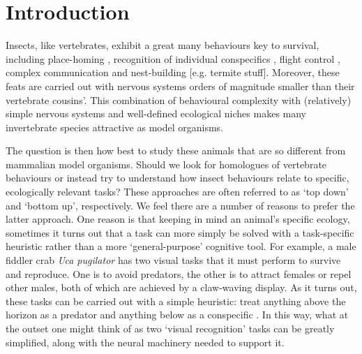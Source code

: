 \section*{Introduction}

Insects, like vertebrates, exhibit a great many behaviours key to survival, including place-homing \cite{Ofstad2011}, recognition of individual conspecifics \cite{Sheehan2008}, flight control \cite{Taylor2001,Gotz1987}, complex communication \cite{VonFrisch1967} and nest-building [e.g. termite stuff].
Moreover, these feats are carried out with nervous systems orders of magnitude smaller than their vertebrate cousins'.
This combination of behavioural complexity with (relatively) simple nervous systems and well-defined ecological niches makes many invertebrate species attractive as model organisms.

The question is then how best to study these animals that are so different from mammalian model organisms.
Should we look for homologues of vertebrate behaviours or instead try to understand how insect behaviours relate to specific, ecologically relevant tasks?
These approaches are often referred to as `top down' and `bottom up', respectively.
We feel there are a number of reasons to prefer the latter approach.
One reason is that keeping in mind an animal's specific ecology, sometimes it turns out that a task can more simply be solved with a task-specific heuristic rather than a more `general-purpose' cognitive tool.
For example, a male fiddler crab \emph{Uca pugilator} has two visual tasks that it must perform to survive and reproduce.
One is to avoid predators, the other is to attract females or repel other males, both of which are achieved by a claw-waving display.
As it turns out, these tasks can be carried out with a simple heuristic: treat anything above the horizon as a predator and anything below as a conspecific \cite{Layne1997}.
In this way, what at the outset one might think of as two `visual recognition' tasks can be greatly simplified, along with the neural machinery needed to support it.

